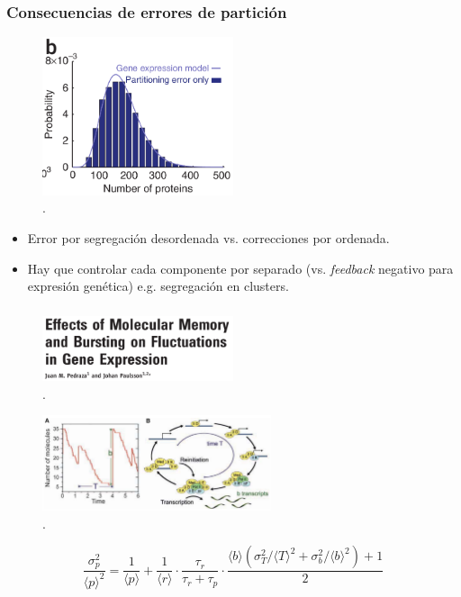 \documentclass{beamer}
\begin{document}
\begin{frame}
\frametitle{Consecuencias de errores de partici\'on}

\begin{figure}[p]
    \centering
    \includegraphics[width=0.5\textwidth]{fitting.png}\\
    \tiny \cite{huh11a}.
\end{figure}

\begin{itemize}

\item Error por segregaci\'on desordenada vs. correcciones por ordenada.

\item Hay que controlar cada componente por separado (vs. \textit{feedback} negativo para expresi\'on gen\'etica) e.g. segregaci\'on en clusters.

\end{itemize}
\end{frame}

\begin{frame}
\frametitle{}
\begin{figure}[p]
    \centering
    \includegraphics[width=0.5\textwidth]{pedraza08.png}\\
    \tiny \cite{pedraza08}.
\end{figure}

\begin{figure}[p]
    \centering
    \includegraphics[width=0.6\textwidth]{bursting.png}\\
    \tiny \cite{pedraza08}.
\end{figure}

$$\frac{\sigma_p^2}{\langle p \rangle^2} = \frac{1}{\langle p \rangle} + \frac{1}{\langle r \rangle} \cdot \frac{\tau_r}{\tau_r + \tau_p} \cdot \frac{\langle b \rangle (\sigma_T^2/\langle T \rangle^2 + \sigma_b^2/\langle b \rangle^2) + 1}{2}$$

\end{frame}
\end{document}
